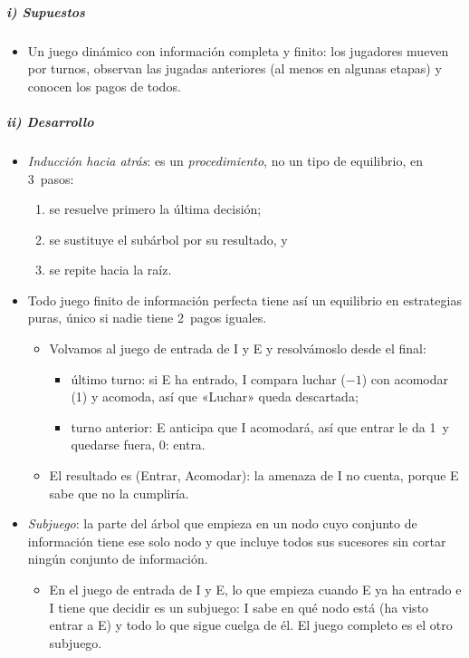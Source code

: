 \documentclass[11pt]{article}
\begin{document}
\subparagraph{i) Supuestos}

\begin{itemize}
\item Un juego dinámico con información completa y finito: los jugadores mueven por turnos, observan las jugadas anteriores (al menos en algunas etapas) y conocen los pagos de todos.
\end{itemize}

\subparagraph{ii) Desarrollo}

\begin{itemize}
\item \emph{Inducción hacia atrás}: es un \emph{procedimiento}, no un tipo de equilibrio, en 3~pasos:
  \begin{enumerate}
  \item se resuelve primero la última decisión;
  \item se sustituye el subárbol por su resultado, y
  \item se repite hacia la raíz.
  \end{enumerate}
\item Todo juego finito de información perfecta tiene así un equilibrio en estrategias puras, único si nadie tiene 2~pagos iguales\nocite{Zermelo1913Anwendung,Kuhn1953Extensive}.
  \begin{itemize}
  \item Volvamos al juego de entrada de \textup{I} y E y resolvámoslo desde el final:
    \begin{itemize}
    \item último turno: si E ha entrado, \textup{I} compara luchar ($-1$) con acomodar (1) y acomoda, así que «Luchar» queda descartada;
    \item turno anterior: E anticipa que \textup{I} acomodará, así que entrar le da 1~y quedarse fuera, 0: entra.
    \end{itemize}
  \item El resultado es (Entrar, Acomodar): la amenaza de \textup{I} no cuenta, porque E sabe que no la cumpliría.
  \end{itemize}
\item \emph{Subjuego}: la parte del árbol que empieza en un nodo cuyo conjunto de información tiene ese solo nodo y que incluye todos sus sucesores sin cortar ningún conjunto de información.
  \begin{itemize}
  \item En el juego de entrada de \textup{I} y E, lo que empieza cuando E ya ha entrado e \textup{I} tiene que decidir es un subjuego: \textup{I} sabe en qué nodo está (ha visto entrar a E) y todo lo que sigue cuelga de él. El juego completo es el otro subjuego.

\end{itemize}
\end{itemize}
\end{document}

